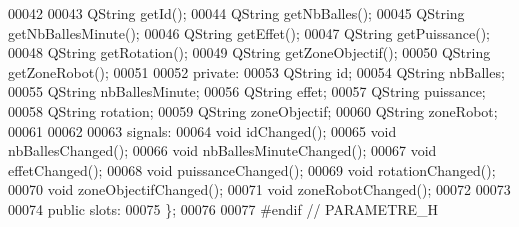 \begin{DoxyCode}
00042 
00043     QString getId();
00044     QString getNbBalles();
00045     QString getNbBallesMinute();
00046     QString getEffet();
00047     QString getPuissance();
00048     QString getRotation();
00049     QString getZoneObjectif();
00050     QString getZoneRobot();
00051 
00052 private:
00053     QString \textcolor{keywordtype}{id};
00054     QString nbBalles;
00055     QString nbBallesMinute;
00056     QString effet;
00057     QString puissance;
00058     QString rotation;
00059     QString zoneObjectif;
00060     QString zoneRobot;
00061 
00062 
00063 signals:
00064     \textcolor{keywordtype}{void} idChanged();
00065     \textcolor{keywordtype}{void} nbBallesChanged();
00066     \textcolor{keywordtype}{void} nbBallesMinuteChanged();
00067     \textcolor{keywordtype}{void} effetChanged();
00068     \textcolor{keywordtype}{void} puissanceChanged();
00069     \textcolor{keywordtype}{void} rotationChanged();
00070     \textcolor{keywordtype}{void} zoneObjectifChanged();
00071     \textcolor{keywordtype}{void} zoneRobotChanged();
00072 
00073 
00074 public slots:
00075 \};
00076 
00077 \textcolor{preprocessor}{#endif // PARAMETRE\_H}
\end{DoxyCode}
